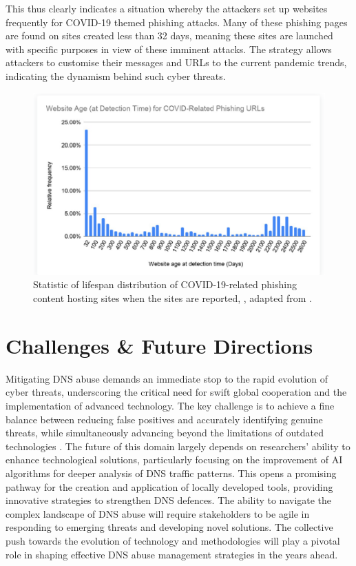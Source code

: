 This thus clearly indicates a situation whereby the attackers set up websites frequently for COVID-19 themed phishing attacks. Many of these phishing pages are found on sites created less than 32 days, meaning these sites are launched with specific purposes in view of these imminent attacks. The strategy allows attackers to customise their messages and URLs to the current pandemic trends, indicating the dynamism behind such cyber threats.

\captionsetup{font= footnotesize}
\begin{figure}[H]
    \centering
    \includegraphics[width=0.8\linewidth]{background/AgeCovid.png}
    \caption{Statistic of lifespan distribution of COVID-19-related phishing content hosting sites when the sites are reported, , adapted from \cite{Unit42AtricleCovidPhishing2021}.}
    \label{fig:figSixteen}
\end{figure}


\section{Challenges \& Future Directions}

Mitigating DNS abuse demands an immediate stop to the rapid evolution of cyber threats, underscoring the critical need for swift global cooperation and the implementation of advanced technology. The key challenge is to achieve a fine balance between reducing false positives and accurately identifying genuine threats, while simultaneously advancing beyond the limitations of outdated technologies \cite{pour2023comprehensive}. The future of this domain largely depends on researchers' ability to enhance technological solutions, particularly focusing on the improvement of AI algorithms for deeper analysis of DNS traffic patterns. This opens a promising pathway for the creation and application of locally developed tools, providing innovative strategies to strengthen DNS defences. The ability to navigate the complex landscape of DNS abuse will require stakeholders to be agile in responding to emerging threats and developing novel solutions. The collective push towards the evolution of technology and methodologies will play a pivotal role in shaping effective DNS abuse management strategies in the years ahead.


